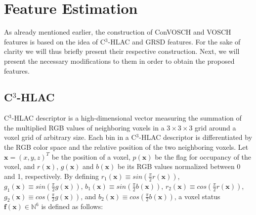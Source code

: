 \documentclass[letterpaper, 10 pt, conference]{sty/ieeeconf}
\begin{document}
\section{Feature Estimation}
\label{sec:features}
As already mentioned earlier, the construction of ConVOSCH and VOSCH features is based on the idea of 
C$^3$-HLAC and GRSD features. For the sake of clarity we will thus briefly present
their respective construction.
Next, we will present the necessary modifications to them in order to obtain the proposed features.

\subsection{C$^3$-HLAC}
\label{sec:color_chlac}
C$^3$-HLAC descriptor is a high-dimensional vector measuring the summation of the 
multiplied RGB values of neighboring voxels in a $3 \times 3 \times 3$ grid around a voxel grid of arbitrary size. 
Each bin in a C$^3$-HLAC descriptor is differentiated by the RGB color space and the 
relative position of the two neighboring voxels. 
Let $\bm{x}=(x,y,z)^T$ be the position of a voxel, $p(\bm{x})$ be the flag for occupancy 
of the voxel, and $r(\bm{x})$, $g(\bm{x})$ and $b(\bm{x})$ be its RGB values normalized 
between 0 and 1, respectively.  By defining 
$r_1(\bm{x}) \equiv sin\left( \frac{\pi}{2}r(\bm{x})\right)$, $g_1(\bm{x}) \equiv sin\left( \frac{\pi}{2}g(\bm{x})\right)$, $b_1(\bm{x}) \equiv sin\left( \frac{\pi}{2}b(\bm{x})\right)$, 
$r_2(\bm{x}) \equiv cos\left( \frac{\pi}{2}r(\bm{x})\right)$, $g_2(\bm{x}) \equiv cos\left( \frac{\pi}{2}g(\bm{x})\right)$, and $b_2(\bm{x}) \equiv cos\left( \frac{\pi}{2}b(\bm{x})\right)$, 
a voxel status $\bm{f}(\bm{x})\in \mathbb{N}^6$ is defined as follows: 
\end{document}
